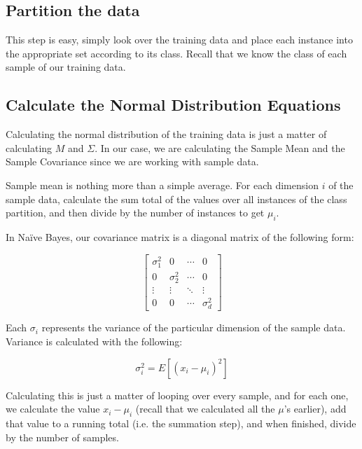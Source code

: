 \documentclass{article}
\begin{document}
\subsection{Partition the data}

This step is easy, simply look over the training data and place each
instance into the appropriate set according to its class.  Recall that
we know the class of each sample of our training data.

\subsection{Calculate the Normal Distribution Equations}
\label{ss:norm_dist}

Calculating the normal distribution of the training data is just a
matter of calculating $M$ and $\Sigma$.  In our case, we are
calculating the Sample Mean and the Sample Covariance
\cite{wiki_covariance} since we are working with sample data.

Sample mean is nothing more than a simple average.  For each dimension
$i$ of the sample data, calculate the sum total of the values over all
instances of the class partition, and then divide by the number of
instances to get $\mu_i$.

In Na\"ive Bayes, our covariance matrix is a diagonal matrix of the
following form:

\begin{displaymath}
\begin{bmatrix} \sigma^2_1 & 0 & \cdots & 0 \\
				 0 & \sigma^2_2 & \cdots & 0 \\
				 \vdots & \vdots & \ddots & \vdots \\
				 0 & 0 & \cdots & \sigma^2_d
\end{bmatrix}
\end{displaymath}

Each $\sigma_i$ represents the variance of the particular dimension of
the sample data.  Variance is calculated with the following:

\begin{displaymath}
 \sigma^2_i = E [{(x_i - \mu_i)}^2]
\end{displaymath}

Calculating this is just a matter of looping over every sample, and
for each one, we calculate the value $x_i - \mu_i$ (recall that we
calculated all the $\mu$'s earlier), add that value to a running total
(i.e. the summation step), and when finished, divide by the number of
samples.
\end{document}
